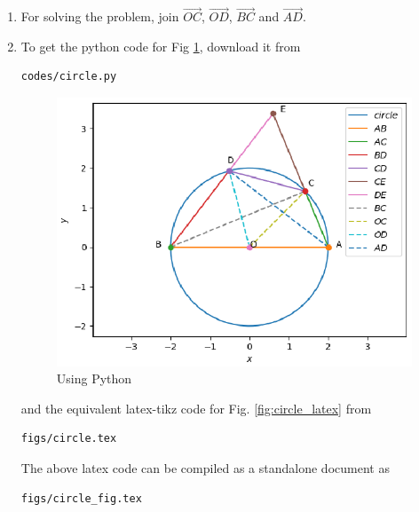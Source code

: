 \begin{enumerate}[label=\thesection.\arabic*.,ref=\thesection.\theenumi]
\begin{table}[ht!]
\centering

\caption{To construct the figure}
\label{table:table2}
\end{table}
%
\item For solving the problem, join $\vec{OC}$, $\vec{OD}$, $\vec{BC}$ and $\vec{AD}$.
\item To get the python code for Fig \ref{fig:circle_python}, download it from
\begin{lstlisting}
codes/circle.py
\end{lstlisting}
\begin{figure}[!ht]
\centering
\includegraphics[width= \columnwidth]{Figure_1.eps}
\caption{Using Python}
\label{fig:circle_python}
\end{figure}
%
and the equivalent latex-tikz code for Fig. \ref{fig:circle_latex} from
\begin{lstlisting}
figs/circle.tex
\end{lstlisting}
%
The above latex code can be compiled as a standalone document as
\begin{lstlisting}
figs/circle_fig.tex
\end{lstlisting}



\end{enumerate}